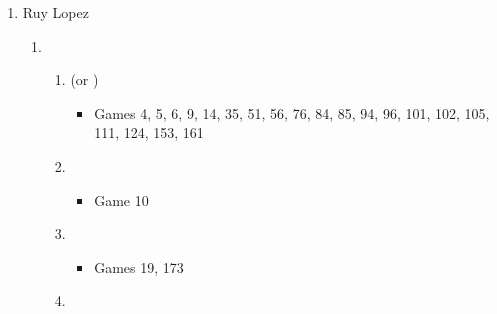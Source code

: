 \begin{enumerate}
\begin{enumerate}
\item \newgame{}
\begin{itemize}
\item Games 8, 29
\end{itemize}

\item \newgame{}
\begin{itemize}
\item Game 125
\end{itemize}
\end{enumerate}
\item Ruy Lopez
\begin{enumerate}
\item \newgame{}
\begin{enumerate}
\item {} (or )
\begin{itemize}
\item Games 4, 5, 6, 9, 14, 35, 51, 56, 76, 84, 85, 94, 96, 101, 102, 105, 111, 124, 153, 161
\end{itemize}
\item {}
\begin{itemize}
\item Game 10
\end{itemize}
\item {}
\begin{itemize}
\item Games 19, 173
\end{itemize}
\item {}

\end{enumerate}


\end{enumerate}
\end{enumerate}
